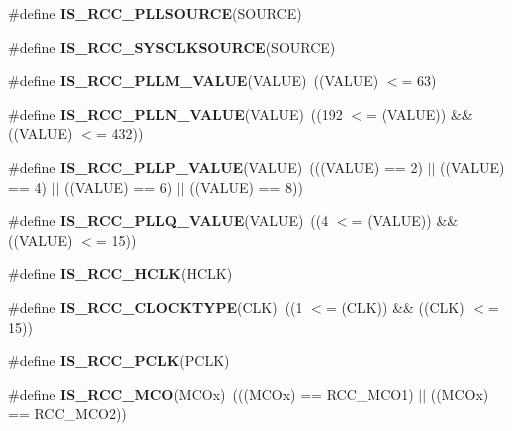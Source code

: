 \begin{DoxyCompactItemize}
\item 
\#define {\bfseries I\+S\+\_\+\+R\+C\+C\+\_\+\+P\+L\+L\+S\+O\+U\+R\+CE}(S\+O\+U\+R\+CE)
\item 
\#define {\bfseries I\+S\+\_\+\+R\+C\+C\+\_\+\+S\+Y\+S\+C\+L\+K\+S\+O\+U\+R\+CE}(S\+O\+U\+R\+CE)
\item 
\#define {\bfseries I\+S\+\_\+\+R\+C\+C\+\_\+\+P\+L\+L\+M\+\_\+\+V\+A\+L\+UE}(V\+A\+L\+UE)~((V\+A\+L\+UE) $<$= 63)\hypertarget{group___r_c_c___i_s___r_c_c___definitions_ga8db327c085e20aeb673a9784f8508597}{}\label{group___r_c_c___i_s___r_c_c___definitions_ga8db327c085e20aeb673a9784f8508597}

\item 
\#define {\bfseries I\+S\+\_\+\+R\+C\+C\+\_\+\+P\+L\+L\+N\+\_\+\+V\+A\+L\+UE}(V\+A\+L\+UE)~((192 $<$= (V\+A\+L\+UE)) \&\& ((V\+A\+L\+UE) $<$= 432))\hypertarget{group___r_c_c___i_s___r_c_c___definitions_ga12835741fbedd278ad1e91abebe00837}{}\label{group___r_c_c___i_s___r_c_c___definitions_ga12835741fbedd278ad1e91abebe00837}

\item 
\#define {\bfseries I\+S\+\_\+\+R\+C\+C\+\_\+\+P\+L\+L\+P\+\_\+\+V\+A\+L\+UE}(V\+A\+L\+UE)~(((V\+A\+L\+UE) == 2) $\vert$$\vert$ ((V\+A\+L\+UE) == 4) $\vert$$\vert$ ((V\+A\+L\+UE) == 6) $\vert$$\vert$ ((V\+A\+L\+UE) == 8))\hypertarget{group___r_c_c___i_s___r_c_c___definitions_gad808f83505f4e802e5bafab7831f0235}{}\label{group___r_c_c___i_s___r_c_c___definitions_gad808f83505f4e802e5bafab7831f0235}

\item 
\#define {\bfseries I\+S\+\_\+\+R\+C\+C\+\_\+\+P\+L\+L\+Q\+\_\+\+V\+A\+L\+UE}(V\+A\+L\+UE)~((4 $<$= (V\+A\+L\+UE)) \&\& ((V\+A\+L\+UE) $<$= 15))\hypertarget{group___r_c_c___i_s___r_c_c___definitions_gad66dbe75bf8ab2b64b200e796281a851}{}\label{group___r_c_c___i_s___r_c_c___definitions_gad66dbe75bf8ab2b64b200e796281a851}

\item 
\#define {\bfseries I\+S\+\_\+\+R\+C\+C\+\_\+\+H\+C\+LK}(H\+C\+LK)
\item 
\#define {\bfseries I\+S\+\_\+\+R\+C\+C\+\_\+\+C\+L\+O\+C\+K\+T\+Y\+PE}(C\+LK)~((1 $<$= (C\+LK)) \&\& ((C\+LK) $<$= 15))\hypertarget{group___r_c_c___i_s___r_c_c___definitions_gaedf7abbab300ed340b88d5f665910707}{}\label{group___r_c_c___i_s___r_c_c___definitions_gaedf7abbab300ed340b88d5f665910707}

\item 
\#define {\bfseries I\+S\+\_\+\+R\+C\+C\+\_\+\+P\+C\+LK}(P\+C\+LK)
\item 
\#define {\bfseries I\+S\+\_\+\+R\+C\+C\+\_\+\+M\+CO}(M\+C\+Ox)~(((M\+C\+Ox) == R\+C\+C\+\_\+\+M\+C\+O1) $\vert$$\vert$ ((M\+C\+Ox) == R\+C\+C\+\_\+\+M\+C\+O2))\hypertarget{group___r_c_c___i_s___r_c_c___definitions_gaac2d2f9b0c3e2f4fbe2131d779080964}{}\label{group___r_c_c___i_s___r_c_c___definitions_gaac2d2f9b0c3e2f4fbe2131d779080964}


\end{DoxyCompactItemize}
